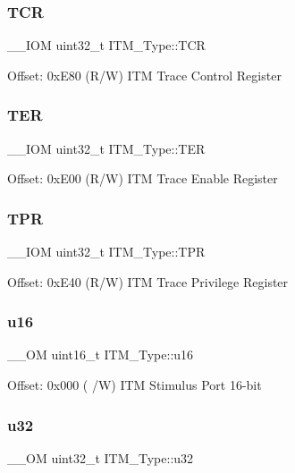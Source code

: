\subsubsection{\texorpdfstring{TCR}{TCR}}
{\footnotesize\ttfamily \+\_\+\+\_\+\+I\+OM uint32\+\_\+t I\+T\+M\+\_\+\+Type\+::\+T\+CR}

Offset\+: 0x\+E80 (R/W) I\+TM Trace Control Register \mbox{\label{structITM__Type_acd03c6858f7b678dab6a6121462e7807}} 
\subsubsection{\texorpdfstring{TER}{TER}}
{\footnotesize\ttfamily \+\_\+\+\_\+\+I\+OM uint32\+\_\+t I\+T\+M\+\_\+\+Type\+::\+T\+ER}

Offset\+: 0x\+E00 (R/W) I\+TM Trace Enable Register \mbox{\label{structITM__Type_ae907229ba50538bf370fbdfd54c099a2}} 
\subsubsection{\texorpdfstring{TPR}{TPR}}
{\footnotesize\ttfamily \+\_\+\+\_\+\+I\+OM uint32\+\_\+t I\+T\+M\+\_\+\+Type\+::\+T\+PR}

Offset\+: 0x\+E40 (R/W) I\+TM Trace Privilege Register \mbox{\label{structITM__Type_a962a970dfd286cad7f8a8577e87d4ad3}} 
\subsubsection{\texorpdfstring{u16}{u16}}
{\footnotesize\ttfamily \+\_\+\+\_\+\+OM uint16\+\_\+t I\+T\+M\+\_\+\+Type\+::u16}

Offset\+: 0x000 ( /W) I\+TM Stimulus Port 16-\/bit \mbox{\label{structITM__Type_a5834885903a557674f078f3b71fa8bc8}} 
\subsubsection{\texorpdfstring{u32}{u32}}
{\footnotesize\ttfamily \+\_\+\+\_\+\+OM uint32\+\_\+t I\+T\+M\+\_\+\+Type\+::u32}

